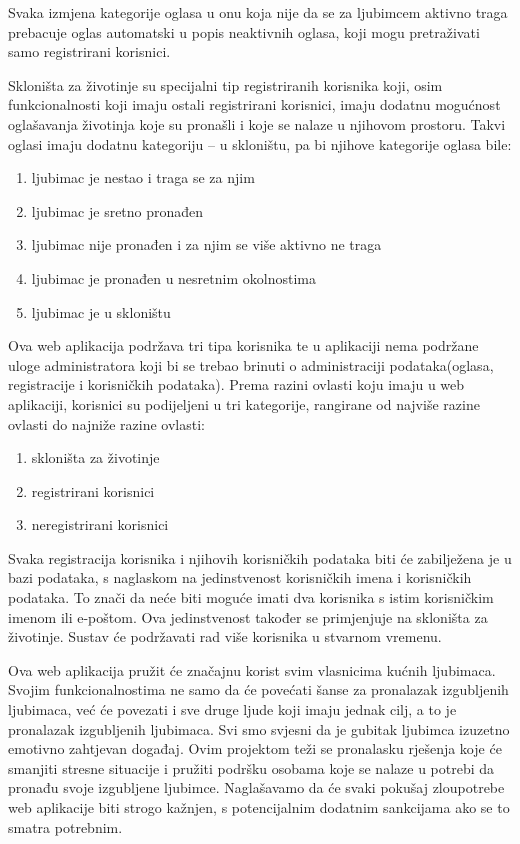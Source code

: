 		Svaka izmjena kategorije oglasa u onu koja nije da se za ljubimcem aktivno traga prebacuje oglas automatski u popis neaktivnih oglasa, koji mogu pretraživati samo registrirani korisnici.
		
		Skloništa za životinje su specijalni tip registriranih korisnika koji, osim funkcionalnosti koji imaju ostali registrirani korisnici, imaju dodatnu mogućnost oglašavanja životinja koje su pronašli i koje se nalaze u njihovom prostoru. Takvi oglasi imaju dodatnu kategoriju – u skloništu, pa bi njihove kategorije oglasa bile:
		
		\begin{enumerate}
			\item ljubimac je nestao i traga se za njim
			\item ljubimac je sretno pronađen
			\item ljubimac nije pronađen i za njim se više aktivno ne traga
			\item ljubimac je pronađen u nesretnim okolnostima
			\item ljubimac je u skloništu
		\end{enumerate}
		
		Ova web aplikacija podržava tri tipa korisnika te u aplikaciji nema podržane uloge administratora koji bi se trebao brinuti o administraciji podataka(oglasa, registracije i korisničkih podataka). Prema razini ovlasti koju imaju u web aplikaciji, korisnici su podijeljeni u tri kategorije, rangirane od najviše razine ovlasti do najniže razine ovlasti:
		
		\begin{enumerate}
			\item skloništa za životinje
			\item registrirani korisnici
			\item neregistrirani korisnici
		\end{enumerate}
		
		Svaka registracija korisnika i njihovih korisničkih podataka biti će zabilježena je u bazi podataka, s naglaskom na jedinstvenost korisničkih imena i korisničkih podataka. To znači da neće biti moguće imati dva korisnika s istim korisničkim imenom ili e-poštom. Ova jedinstvenost također se primjenjuje na skloništa za životinje. Sustav će podržavati rad više korisnika u stvarnom vremenu.
		
		Ova web aplikacija pružit će značajnu korist svim vlasnicima kućnih ljubimaca. Svojim funkcionalnostima ne samo da će povećati šanse za pronalazak izgubljenih ljubimaca, već će povezati i sve druge ljude koji imaju jednak cilj, a to je pronalazak izgubljenih ljubimaca. Svi smo svjesni da je gubitak ljubimca izuzetno emotivno zahtjevan događaj. Ovim projektom teži se pronalasku rješenja koje će smanjiti stresne situacije i pružiti podršku osobama koje se nalaze u potrebi da pronađu svoje izgubljene ljubimce. Naglašavamo da će svaki pokušaj zloupotrebe web aplikacije biti strogo kažnjen, s potencijalnim dodatnim sankcijama ako se to smatra potrebnim.
		

